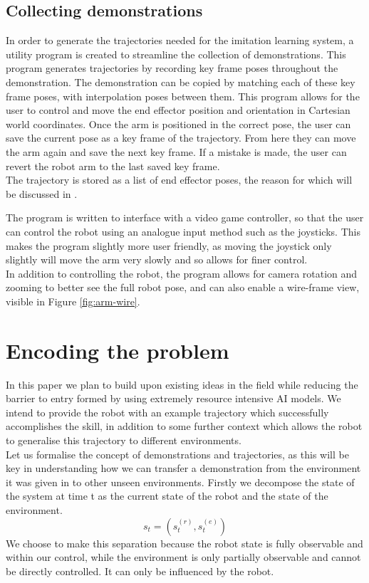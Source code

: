 \subsection{Collecting demonstrations}
In order to generate the trajectories needed for the imitation learning system, a utility program is created to streamline the collection of demonstrations. This program generates trajectories by recording key frame poses throughout the demonstration. The demonstration can be copied by matching each of these key frame poses, with interpolation poses between them.
This program allows for the user to control and move the end effector position and orientation in Cartesian world coordinates. Once the arm is positioned in the correct pose, the user can save the current pose as a key frame of the trajectory. From here they can move the arm again and save the next key frame. If a mistake is made, the user can revert the robot arm to the last saved key frame.\\
The trajectory is stored as a list of end effector poses, the reason for which will be discussed in .

The program is written to interface with a video game controller, so that the user can control the robot using an analogue input method such as the joysticks. This makes the program slightly more user friendly, as moving the joystick only slightly will move the arm very slowly and so allows for finer control.\\
In addition to controlling the robot, the program allows for camera rotation and zooming to better see the full robot pose, and can also enable a wire-frame view, visible in Figure \ref{fig:arm-wire}.


\section{Encoding the problem}
\label{sec:trajectories}
In this paper we plan to build upon existing ideas in the field while reducing the barrier to entry formed by using extremely resource intensive AI models. We intend to provide the robot with an example trajectory which successfully accomplishes the skill, in addition to some further context which allows the robot to generalise this trajectory to different environments.\\

Let us formalise the concept of demonstrations and trajectories, as this will be key in understanding how we can transfer a demonstration from the environment it was given in to other unseen environments. Firstly we decompose the state of the system at time t as the current state of the robot and the state of the environment.
$$s_t = (s^{(r)}_t, s^{(e)}_t)$$
We choose to make this separation because the robot state is fully observable and within our control, while the environment is only partially observable and cannot be directly controlled. It can only be influenced by the robot.

